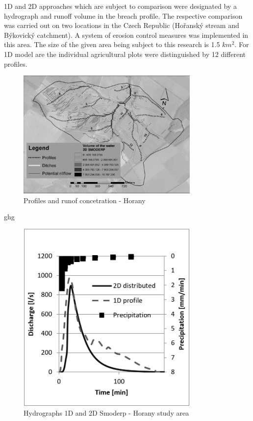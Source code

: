 1D and 2D approaches which are subject to comparison were designated by a hydrograph and runoff volume in the breach profile. The respective comparison was carried out on two locations in the Czech Republic (Hořanský stream and Býkovický catchment). A system of erosion control measures was implemented in this area. The size of the given area being subject to this research is 1.5 $ km^{2} $. For 1D model are the individual agricultural plots were distinguished by 12 different profiles.

\begin{figure}[ht!]
\centering
\includegraphics[width=0.8\textwidth]{img/horany_print3.jpg}
\caption{Profiles and runof concetration - Horany}
\label{fig:horany}
\end{figure}\FloatBarrier
ghg
\begin{figure}[ht!]
\renewcommand{\figurename}{Graf}
\centering
\includegraphics[width=0.8\textwidth]{graph/1D2Dhorany.png}
\caption{Hydrographs 1D and 2D Smoderp - Horany study area}
\label{graf:graf_1}
\end{figure}\FloatBarrier

